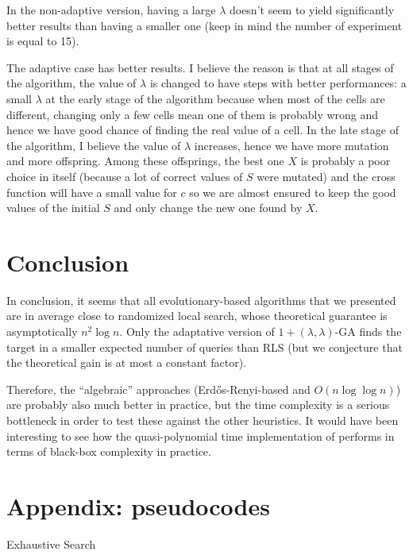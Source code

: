 \documentclass[12pt]{article}
\theoremstyle{definition}
\theoremstyle{plain}
\theoremstyle{remark}
\begin{document}
In the non-adaptive version, having a large $\lambda$ doesn't seem to yield significantly
better results than having a smaller one (keep in mind the number of experiment is equal to 15).

The adaptive case has better results. I believe the reason is that at all stages of the algorithm, the value of $\lambda$ is changed to have steps with better performances: a small $\lambda$ at the early stage of the algorithm because when most of the cells are different, changing only a few cells mean one of them is probably wrong and hence we have good chance of finding the real value of a cell. In the late stage of the algorithm, I believe the value of $\lambda$ increases, hence we have more mutation and more offspring. Among these offsprings, the best one $X$ is probably a poor choice in itself (because a lot of correct values of $S$ were mutated) and the cross function will have a small value for $c$ so we are almost ensured to keep the good values of the initial $S$ and only change the new one found by $X$.

\section{Conclusion}

In conclusion, it seems that all evolutionary-based algorithms that we presented are in average close
to randomized local search, whose theoretical guarantee is asymptotically $n^2\log n$. Only the
adaptative version of $1+(\lambda,\lambda)$-GA finds the target
in a smaller expected number of queries than RLS (but we conjecture that the theoretical gain is at most a
constant factor).

Therefore, the ``algebraic'' approaches (Erd\H{o}s-Renyi-based and $O(n\log \log n)$) are probably also much better
in practice, but the time complexity is a serious bottleneck in order to test these against the other
heuristics. It would have been interesting to see how the quasi-polynomial time implementation of \cite{DOERR} performs
in terms of black-box complexity in practice.

\newpage



\section*{Appendix: pseudocodes}

\begin{algorithm}
	\caption{Exhaustive Search}
\end{algorithm}
\end{document}
